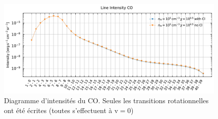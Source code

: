 \begin{appendices}
\begin{figure}[!h]
        \centering \includegraphics[trim = {0 0 0 1cm},clip,width=1\textwidth]{figure/Cl/gridModelEmiss/I_comp_CO.pdf}
        \caption{Diagramme d'intensités du $\mathrm{CO}$. Seules les transitions rotationnelles ont été écrites (toutes s'effectuent à $\mathrm{v}=0$)}
        \label{fig:cl:emiss:CO}
\end{figure}



\end{appendices}
